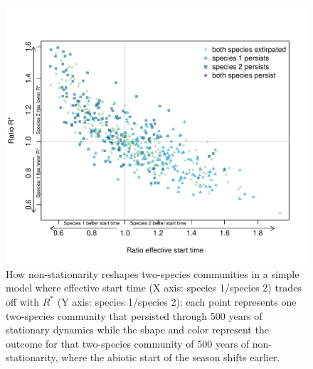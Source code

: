 \documentclass[11pt,letterpaper]{article}
\begin{document}
\begin{figure}[t!]
\centering
\includegraphics[width=1\textwidth]{..//..//R/graphs/modelruns/manuscript/tauIPrstart1.pdf}
\caption{How non-stationarity reshapes two-species communities in a simple model where effective start time (X axis: species 1/species 2) trades off with $R^*$ (Y axis: species 1/species 2): each point represents one two-species community that persisted through 500 years of stationary dynamics while the shape and color represent the outcome for that two-species community of 500 years of non-stationarity, where the abiotic start of the season shifts earlier.}
 \label{fig:tauirstar}
\end{figure}
\end{document}
